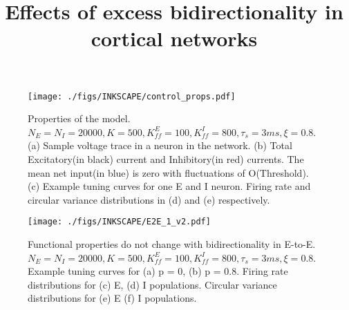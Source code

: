\documentclass[10pt, a4paper, twocolumn]{article}
\title{Effects of excess bidirectionality in cortical networks}
\date{}
\begin{document}
\maketitle
\begin{@twocolumnfalse}
    \maketitle
    \begin{abstract}
    \end{abstract}
  \end{@twocolumnfalse}






\newpage
\begin{small}


\end{small}

\newpage
\begin{figure*}
\centering
\texttt{[image: ./figs/INKSCAPE/control\_props.pdf]}
\caption{\small{Properties of the model. $N_E = N_I = 20000, K = 500, K_{ff}^E = 100, K_{ff}^I = 800, \tau_s = 3ms, \xi = 0.8$. (a) Sample voltage trace in a neuron in the network. (b) Total Excitatory(in black) current and Inhibitory(in red) currents. The mean net input(in blue) is zero with fluctuations of O(Threshold). (c) Example tuning curves for one E and I neuron. Firing rate and circular variance distributions in (d) and (e) respectively.}}
\label{fig:control}
\end{figure*}

\begin{figure*}
\centering
\texttt{[image: ./figs/INKSCAPE/E2E\_1\_v2.pdf]}
\caption{\small{Functional properties do not change with bidirectionality in E-to-E. $N_E = N_I = 20000, K = 500, K_{ff}^E = 100, K_{ff}^I = 800, \tau_s = 3ms, \xi = 0.8$. Example tuning curves for (a) p = 0, (b) p = 0.8. Firing rate distributions for (c) E, (d) I populations. Circular variance distributions for (e) E (f) I populations.}}
\label{fig:e2e1}
\end{figure*}
\end{document}
